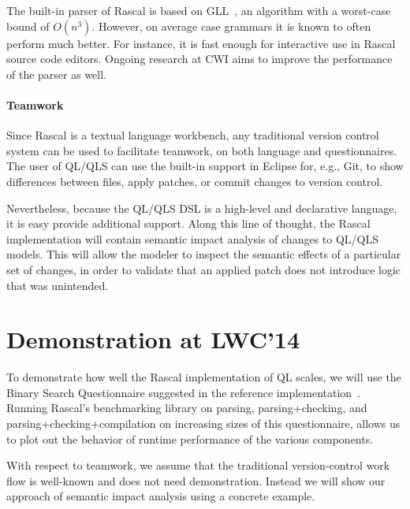 \documentclass[a4paper]{article}
\begin{document}
The built-in parser of Rascal is based on GLL~\cite{GLLPTGEN}, an
algorithm with a worst-case bound of $O(n^3)$. However, on average
case grammars it is known to often perform much better. For instance,
it is fast enough for interactive use in Rascal source code editors.
Ongoing research at CWI aims to improve the performance of the parser
as well.


\paragraph{Teamwork}
Since Rascal is a textual language workbench, any traditional version
control system can be used to facilitate teamwork, on both language and
questionnaires. The user of QL/QLS can use the built-in support in
Eclipse for, e.g., Git, to show differences between files, apply
patches, or commit changes to version control. 

Nevertheless, because the QL/QLS DSL is a high-level and declarative
language, it is easy provide additional support. Along this line of
thought, the Rascal implementation will contain semantic impact
analysis of changes to QL/QLS models. This will allow the modeler to
inspect the semantic effects of a particular set of changes, in order
to validate that an applied patch does not introduce logic that was
unintended. 

\section{Demonstration at LWC'14}

To demonstrate how well the Rascal implementation of QL scales, we will
use the Binary Search Questionnaire suggested in the reference
implementation~\cite{ReferenceImpl}. Running Rascal's benchmarking
library on parsing, parsing+checking, and parsing+checking+compilation
on increasing sizes of this questionnaire, allows us to plot out the
behavior of runtime performance of the various components. 

With respect to teamwork, we assume that the traditional
version-control work flow is well-known and does not need
demonstration. Instead we will show our approach of semantic impact
analysis using a concrete example. 



\end{document}
